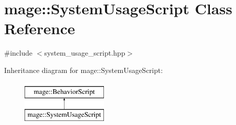 \hypertarget{classmage_1_1_system_usage_script}{}\section{mage\+:\+:System\+Usage\+Script Class Reference}
\label{classmage_1_1_system_usage_script}


{\ttfamily \#include $<$system\+\_\+usage\+\_\+script.\+hpp$>$}

Inheritance diagram for mage\+:\+:System\+Usage\+Script\+:\begin{figure}[H]
\begin{center}
\leavevmode
\includegraphics[height=2.000000cm]{classmage_1_1_system_usage_script}
\end{center}
\end{figure}
